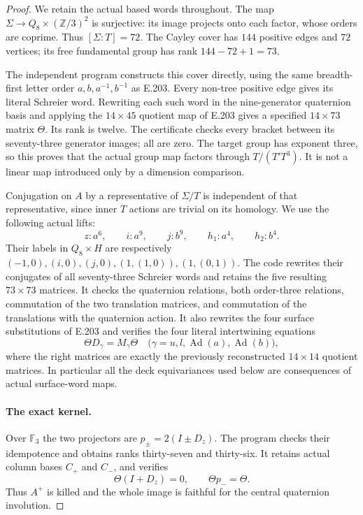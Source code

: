 \begin{proof}
We retain the actual based words throughout.  The map
$\Sigma\to Q_8\times(\mathbb Z/3)^2$ is surjective: its image
projects onto each factor, whose orders are coprime.  Thus
$[\Sigma:T]=72$.  The Cayley cover has $144$ positive edges
and $72$ vertices; its free fundamental group has rank
$144-72+1=73$.

The independent program
 constructs
this cover directly, using the same breadth-first letter order
$a,b,a^{-1},b^{-1}$ as E.203.  Every non-tree positive edge
gives its literal Schreier word.  Rewriting each such word in
the nine-generator quaternion basis and applying the
$14\times45$ quotient map of E.203 gives a specified
$14\times73$ matrix $\Theta$.  Its rank is twelve.  The
certificate checks every bracket between its seventy-three
generator images; all are zero.  The target group has exponent
three, so this proves that the actual group map factors through
$T/(T'T^3)$.  It is not a linear map introduced only by a
dimension comparison.

Conjugation on $A$ by a representative of $\Sigma/T$ is
independent of that representative, since inner $T$ actions
are trivial on its homology.  We use the following actual lifts:
\[
 z:a^6,\qquad i:a^9,\qquad j:b^9,\qquad
 h_1:a^4,\qquad h_2:b^4.                                        \tag{E.207.4}
\]
Their labels in $Q_8\times H$ are respectively
$(-1,0),(i,0),(j,0),(1,(1,0)),(1,(0,1))$.
The code rewrites their conjugates of all seventy-three
Schreier words and retains the five resulting $73\times73$
matrices.  It checks the quaternion relations, both order-three
relations, commutation of the two translation matrices, and
commutation of the translations with the quaternion action.
It also rewrites the four surface substitutions of E.203
and verifies the four literal intertwining equations
\[
                   \Theta D_\gamma=M_\gamma\Theta
 \quad\bigl(\gamma=u,l,\operatorname{Ad}(a),
                         \operatorname{Ad}(b)\bigr),             \tag{E.207.5}
\]
where the right matrices are exactly the previously reconstructed
$14\times14$ quotient matrices.  In particular all the
deck equivariances used below are consequences of actual
surface-word maps.

\paragraph{The exact kernel.}
Over $\mathbb F_3$ the two projectors are
$p_\pm=2(I\pm D_z)$.  The program checks their idempotence
and obtains ranks thirty-seven and thirty-six.  It retains
actual column bases $C_+$ and $C_-$, and verifies
\[
                   \Theta(I+D_z)=0,\qquad
                   \Theta p_-=\Theta.                            \tag{E.207.6}
\]
Thus $A^+$ is killed and the whole image is faithful for the
central quaternion involution.


\end{proof}
